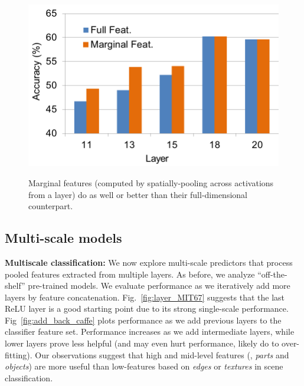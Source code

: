 \documentclass[10pt,twocolumn,letterpaper]{article}
\begin{document}
\begin{figure}[t!]
\centering
	{\includegraphics[width=.6\columnwidth]{fig/full_marg.png}}
\caption{Marginal features (computed by spatially-pooling across activations from a layer) do as well or better than their full-dimensional counterpart. }
\label{fig:full_marg}
\end{figure}


\subsection{Multi-scale models} 

{\bf Multiscale classification:} We now explore multi-scale predictors that process pooled features extracted from multiple layers. As before, we analyze ``off-the-shelf'' pre-trained models. We evaluate performance as we iteratively add more layers \textcolor[rgb]{1,0,0}{by feature concatenation}. Fig.~\ref{fig:layer_MIT67} suggests that the last ReLU layer is a good starting point due to its strong single-scale performance. Fig~\ref{fig:add_back_caffe} plots performance as we add previous layers to the classifier feature set. Performance increases as we add intermediate layers, while lower layers prove less helpful (and may even hurt performance, likely do to over-fitting). Our observations suggest that high and mid-level features (\ie, \textit{parts} and \textit{objects}) are more useful than low-features based on \textit{edges} or \textit{textures} in scene classification. 
\end{document}
